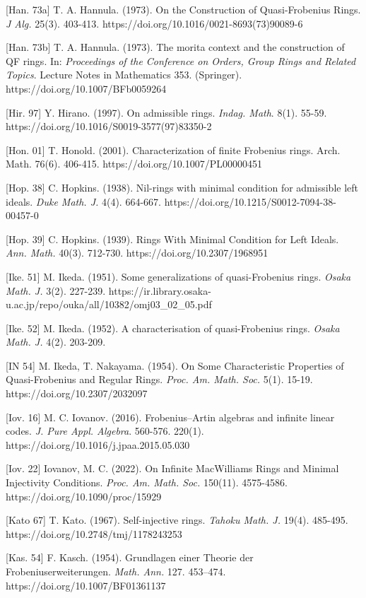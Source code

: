 \documentclass[11pt]{article}
\theoremstyle{plain}
\theoremstyle{remark}
\theoremstyle{plain}
\begin{document}
[Han. 73a] T. A. Hannula. (1973). On the Construction of Quasi-Frobenius Rings. \textit{J Alg.} 25(3). 403-413. https://doi.org/10.1016/0021-8693(73)90089-6

[Han. 73b]  T. A. Hannula. (1973). The morita context and the construction of QF rings. In: \textit{Proceedings of the Conference on Orders, Group Rings and Related Topics}. Lecture Notes in Mathematics 353. (Springer). https://doi.org/10.1007/BFb0059264

[Hir. 97] Y. Hirano. (1997). On admissible rings. \textit{Indag. Math}. 8(1).  55-59. https://doi.org/10.1016/S0019-3577(97)83350-2

[Hon. 01] T.  Honold. (2001). Characterization of finite Frobenius rings. Arch. Math. 76(6). 406-415. https://doi.org/10.1007/PL00000451

[Hop. 38] C. Hopkins. (1938). Nil-rings with minimal condition for admissible left ideals. \textit{Duke Math. J.} 4(4). 664-667. https://doi.org/10.1215/S0012-7094-38-00457-0


[Hop. 39] C. Hopkins. (1939). Rings With Minimal Condition for Left Ideals. \textit{Ann. Math.} 40(3). 712-730. https://doi.org/10.2307/1968951


[Ike. 51] M. Ikeda. (1951). Some generalizations of quasi-Frobenius rings. \textit{Osaka Math. J.} 3(2). 227-239. https://ir.library.osaka-u.ac.jp/repo/ouka/all/10382/omj03\_02\_05.pdf 

[Ike. 52] M. Ikeda. (1952). A characterisation of quasi-Frobenius rings. \textit{Osaka Math. J.} 4(2). 203-209. 



[IN 54] M. Ikeda, T. Nakayama. (1954). On Some Characteristic Properties of Quasi-Frobenius and Regular Rings. \textit{Proc. Am. Math. Soc.} 5(1). 15-19. https://doi.org/10.2307/2032097

 [Iov. 16] M. C. Iovanov. (2016). Frobenius–Artin algebras and infinite linear codes. \textit{J. Pure Appl. Algebra}. 560-576. 
 220(1). https://doi.org/10.1016/j.jpaa.2015.05.030

  [Iov. 22] Iovanov, M. C. (2022). On Infinite MacWilliams Rings and Minimal Injectivity Conditions. \textit{Proc. Am. Math. Soc.} 150(11). 4575-4586. https://doi.org/10.1090/proc/15929

[Kato 67] T. Kato. (1967). Self-injective rings. \textit{Tahoku Math. J.} 19(4).  485-495. https://doi.org/10.2748/tmj/1178243253

[Kas. 54] F. Kasch. (1954). Grundlagen einer Theorie der Frobeniuserweiterungen. \textit{Math. Ann.} 127. 453–474. https://doi.org/10.1007/BF01361137
\end{document}
